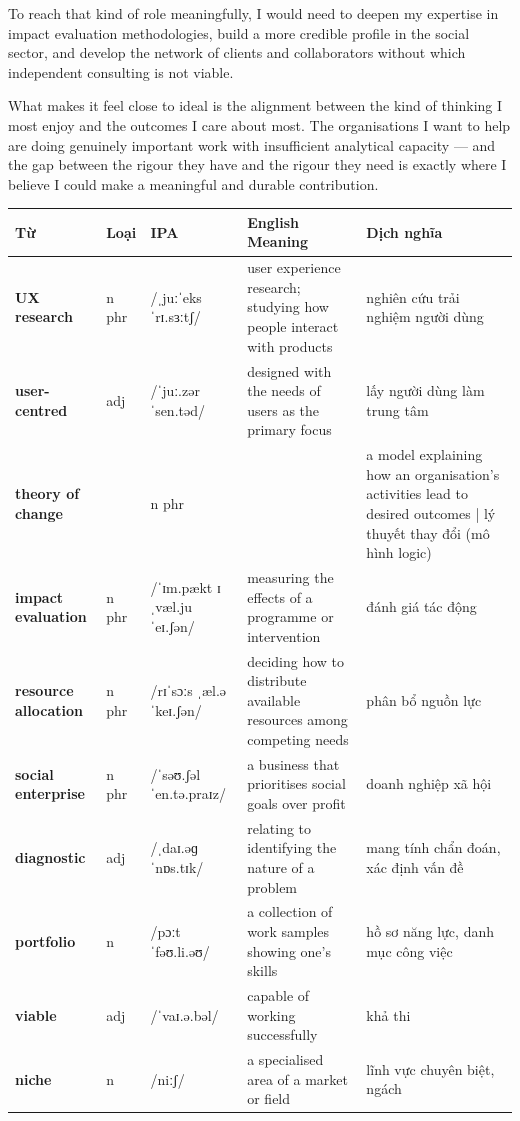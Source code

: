 \begin{ieltsanswer}
To reach that kind of role meaningfully, I would need to deepen my expertise in impact evaluation methodologies, build a more credible profile in the social sector, and develop the network of clients and collaborators without which independent consulting is not viable.

What makes it feel close to ideal is the alignment between the kind of thinking I most enjoy and the outcomes I care about most. The organisations I want to help are doing genuinely important work with insufficient analytical capacity — and the gap between the rigour they have and the rigour they need is exactly where I believe I could make a meaningful and durable contribution.
\end{ieltsanswer}


\vspace{0.8em}
\begin{center}
\renewcommand{\arraystretch}{1.65}
\begin{tabularx}{\textwidth}{|V{0.22\textwidth}|C{0.07\textwidth}|I{0.20\textwidth}|Y|V{0.18\textwidth}|}
\hline
{}
\textbf{Từ} & \textbf{Loại} & \textbf{IPA} & \textbf{English Meaning} & \textbf{Dịch nghĩa} \\
\hline
\textbf{UX research} & n phr & /ˌjuːˈeks ˈrɪ.sɜːtʃ/ & user experience research; studying how people interact with products & nghiên cứu trải nghiệm người dùng \\ \hline
\textbf{user-centred} & adj & /ˈjuː.zər ˈsen.təd/ & designed with the needs of users as the primary focus & lấy người dùng làm trung tâm \\ \hline
\textbf{theory of change} & & n phr & & a model explaining how an organisation's activities lead to desired outcomes | lý thuyết thay đổi (mô hình logic) \\ \hline
\textbf{impact evaluation} & n phr & /ˈɪm.pækt ɪˌvæl.juˈeɪ.ʃən/ & measuring the effects of a programme or intervention & đánh giá tác động \\ \hline
\textbf{resource allocation} & n phr & /rɪˈsɔːs ˌæl.əˈkeɪ.ʃən/ & deciding how to distribute available resources among competing needs & phân bổ nguồn lực \\ \hline
\textbf{social enterprise} & n phr & /ˈsəʊ.ʃəl ˈen.tə.praɪz/ & a business that prioritises social goals over profit & doanh nghiệp xã hội \\ \hline
\textbf{diagnostic} & adj & /ˌdaɪ.əɡˈnɒs.tɪk/ & relating to identifying the nature of a problem & mang tính chẩn đoán, xác định vấn đề \\ \hline
\textbf{portfolio} & n & /pɔːtˈfəʊ.li.əʊ/ & a collection of work samples showing one's skills & hồ sơ năng lực, danh mục công việc \\ \hline
\textbf{viable} & adj & /ˈvaɪ.ə.bəl/ & capable of working successfully & khả thi \\ \hline
\textbf{niche} & n & /niːʃ/ & a specialised area of a market or field & lĩnh vực chuyên biệt, ngách \\ \hline
\end{tabularx}
\end{center}

